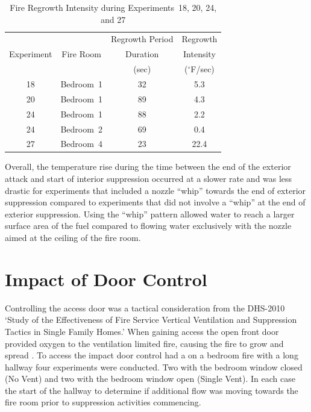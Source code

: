 \documentclass[12pt,oneside]{book}
\begin{document}
\begin{table}[H]
\centering
\caption{Fire Regrowth Intensity during Experiments~18, 20, 24, and 27}
\begin{tabular}{|c|c|c|c|} 
\hline
\multirow{3}{*}{Experiment} & \multirow{3}{*}{Fire Room} 	& Regrowth Period & Regrowth  \\ 
							& 								& Duration 		  & Intensity \\
							& 								& (sec) 		  & ($^\circ$F/sec) \\							
\hline \hline
18 							& Bedroom~1 					& 32 			  & 5.3 	\\ \hline
20 							& Bedroom~1 					& 89 			  & 4.3 	\\ \hline
24 							& Bedroom~1 					& 88 			  & 2.2 	\\ \hline
24 							& Bedroom~2 					& 69 			  & 0.4 	\\ \hline
27 							& Bedroom~4 					& 23 			  & 22.4 	\\ \hline
\end{tabular}
\label{table:regrowth_intensity}
\end{table}

Overall, the temperature rise during the time between the end of the exterior attack and start of interior suppression occurred at a slower rate and was less drastic for experiments that included a nozzle ``whip'' towards the end of exterior suppression compared to experiments that did not involve a ``whip'' at the end of exterior suppression. Using the ``whip'' pattern allowed water to reach a larger surface area of the fuel compared to flowing water exclusively with the nozzle aimed at the ceiling of the fire room.

\section{Impact of Door Control}
Controlling the access door was a tactical consideration from the DHS-2010 `Study of the Effectiveness of Fire Service Vertical Ventilation and Suppression Tactics in Single Family Homes.' When gaining access the open front door provided oxygen to the ventilation limited fire, causing the fire to grow and spread \cite{DHS2010}. To access the impact door control had a on a bedroom fire with a long hallway four experiments were conducted. Two with the bedroom window closed (No Vent) and two with the bedroom window open (Single Vent). In each case the start of the hallway to determine if additional flow was moving towards the fire room prior to suppression activities commencing. 
\end{document}

